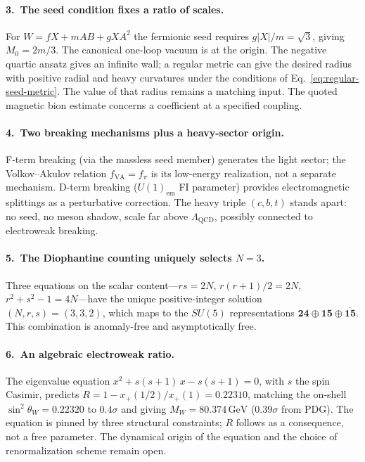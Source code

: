\documentclass[12pt,a4paper]{article}
\newcommand{\GeV}{\,\text{GeV}}
\begin{document}
\paragraph{3.\ The seed condition fixes a ratio of scales.}
For $W=fX+mAB+gXA^2$ the fermionic seed requires $g|X|/m=\sqrt3$,
giving $M_0=2m/3$. The canonical one-loop vacuum is at the origin.
The negative quartic ansatz gives an infinite wall; a regular metric can
give the desired radius with positive radial and heavy curvatures under
the conditions of Eq.~\eqref{eq:regular-seed-metric}. The value of that
radius remains a matching input. The quoted magnetic bion estimate
concerns a coefficient at a specified coupling.

\paragraph{4.\ Two breaking mechanisms plus a heavy-sector origin.}
F-term breaking (via the massless seed member) generates the light 
sector; the Volkov--Akulov relation $f_{\text{VA}} = f_\pi$ is its 
low-energy realization, not a separate mechanism. D-term breaking 
($U(1)_{\text{em}}$ FI parameter) provides electromagnetic 
splittings as a perturbative correction. The heavy triple 
$(c,b,t)$ stands apart: no seed, no meson shadow, scale far above 
$\Lambda_{\text{QCD}}$, possibly connected to electroweak breaking.

\paragraph{5.\ The Diophantine counting uniquely selects $N=3$.}
Three equations on the scalar content---$rs = 2N$, $r(r+1)/2 = 2N$,
$r^2+s^2-1 = 4N$---have the unique positive-integer solution
$(N,r,s) = (3,3,2)$, which maps to the $SU(5)$ representations
$\mathbf{24} \oplus \mathbf{15} \oplus \overline{\mathbf{15}}$.
This combination is anomaly-free and asymptotically free.

\paragraph{6.\ An algebraic electroweak ratio.}
The eigenvalue equation $x^2 + s(s+1)\,x - s(s+1) = 0$, with
$s$ the spin Casimir, predicts
$R = 1 - x_+(1/2)/x_+(1) = 0.22310$, matching the on-shell
$\sin^2\theta_W = 0.22320$ to $0.4\sigma$ and giving
$M_W = 80.374\GeV$ ($0.39\sigma$ from PDG). The equation is
pinned by three structural constraints; $R$ follows as a
consequence, not a free parameter. The dynamical origin of the
equation and the choice of renormalization scheme remain open.
\end{document}

